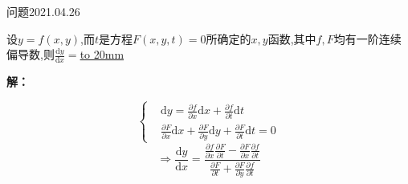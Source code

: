 \begin{mybox}{问题2021.04.26}
	
	\qquad 设$y=f(x,y)$,而$t$是方程$F(x,y,t)=0$所确定的$x,y$函数,其中$f,F$均有一阶连续偏导数,则$\frac{\mathrm{d}y}{\mathrm{d}x}=$\underline{\hbox to 20mm{}}
\end{mybox}
\noindent
\textbf{解：}

\begin{equation*}
	\left\{
	\begin{aligned}
		&\mathrm{d}y=\frac{\partial f}{\partial x}\mathrm{d}x+\frac{\partial f}{\partial t}\mathrm{d}t\\
		&\frac{\partial F}{\partial x}\mathrm{d}x+\frac{\partial F}{\partial y}\mathrm{d}y+\frac{\partial F}{\partial t}\mathrm{d}t=0
	\end{aligned}
	\right.
\end{equation*}
$$\Rightarrow \frac{\mathrm{d}y}{\mathrm{d}x}=\frac{\frac{\partial f}{\partial x}\frac{\partial F}{\partial t}-\frac{\partial F}{\partial x}\frac{\partial f}{\partial t}}{\frac{\partial F}{\partial t}+\frac{\partial F}{\partial y}\frac{\partial f}{\partial t}}$$
